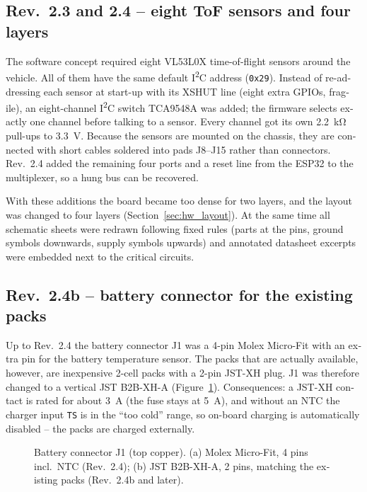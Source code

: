 \begin{otherlanguage}{english}
\subsection{Rev.~2.3 and 2.4 -- eight ToF sensors and four layers}
The software concept required eight VL53L0X time-of-flight sensors around the vehicle. All of them
have the same default I\textsuperscript{2}C address (\texttt{0x29}). Instead of re-addressing each sensor at
start-up with its XSHUT line (eight extra GPIOs, fragile), an eight-channel I\textsuperscript{2}C switch
TCA9548A \cite{TI_TCA9548A} was added; the firmware selects exactly one channel before talking to a
sensor. Every channel got its own \SI{2.2}{\kilo\ohm} pull-ups to \SI{3.3}{\volt}. Because the sensors are
mounted on the chassis, they are connected with short cables soldered into pads J8--J15 rather than
connectors. Rev.~2.4 added the remaining four ports and a reset line from the ESP32 to the
multiplexer, so a hung bus can be recovered.

With these additions the board became too dense for two layers, and the layout was changed to four
layers (Section~\ref{sec:hw_layout}). At the same time all schematic sheets were redrawn following
fixed rules (parts at the pins, ground symbols downwards, supply symbols upwards) and annotated datasheet
excerpts were embedded next to the critical circuits.

\subsection{Rev.~2.4b -- battery connector for the existing packs}
\label{sec:hw_rev24b}
Up to Rev.~2.4 the battery connector J1 was a 4-pin Molex Micro-Fit with an extra pin for the
battery temperature sensor. The packs that are actually available, however, are inexpensive 2-cell
packs with a 2-pin JST-XH plug. J1 was therefore changed to a vertical JST B2B-XH-A
(Figure~\ref{fig:hw_j1}). Consequences: a JST-XH contact is rated for about \SI{3}{\ampere}
(the fuse stays at \SI{5}{\ampere}), and without an NTC the charger input \texttt{TS} is in the
``too cold'' range, so on-board charging is automatically disabled -- the packs are charged externally.

\begin{figure}[htbp]
  \centering
  \caption{Battery connector J1 (top copper). (a) Molex Micro-Fit, 4 pins incl.\ NTC (Rev.~2.4);
           (b) JST B2B-XH-A, 2 pins, matching the existing packs (Rev.~2.4b and later).}
  \label{fig:hw_j1}
\end{figure}


\end{otherlanguage}
